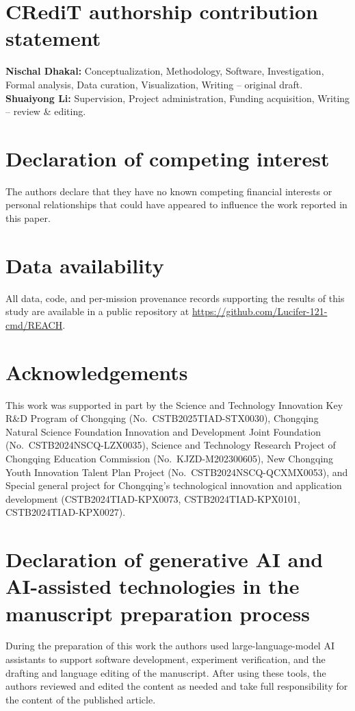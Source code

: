 \documentclass[preprint,12pt]{elsarticle}
\begin{document}
\section*{CRediT authorship contribution statement}
\textbf{Nischal Dhakal:} Conceptualization, Methodology, Software, Investigation, Formal analysis, Data curation, Visualization, Writing -- original draft. \textbf{Shuaiyong Li:} Supervision, Project administration, Funding acquisition, Writing -- review \& editing.

\section*{Declaration of competing interest}
The authors declare that they have no known competing financial interests or personal relationships that could have appeared to influence the work reported in this paper.

\section*{Data availability}
All data, code, and per-mission provenance records supporting the results of this study are available in a public repository at \url{https://github.com/Lucifer-121-cmd/REACH}.

\section*{Acknowledgements}
This work was supported in part by the Science and Technology Innovation Key R\&D Program of Chongqing (No.\ CSTB2025TIAD-STX0030), Chongqing Natural Science Foundation Innovation and Development Joint Foundation (No.\ CSTB2024NSCQ-LZX0035), Science and Technology Research Project of Chongqing Education Commission (No.\ KJZD-M202300605), New Chongqing Youth Innovation Talent Plan Project (No.\ CSTB2024NSCQ-QCXMX0053), and Special general project for Chongqing's technological innovation and application development (CSTB2024TIAD-KPX0073, CSTB2024TIAD-KPX0101, CSTB2024TIAD-KPX0027).


\section*{Declaration of generative AI and AI-assisted technologies in the manuscript preparation process}
During the preparation of this work the authors used large-language-model AI assistants to support software development, experiment verification, and the drafting and language editing of the manuscript. After using these tools, the authors reviewed and edited the content as needed and take full responsibility for the content of the published article.



\end{document}

